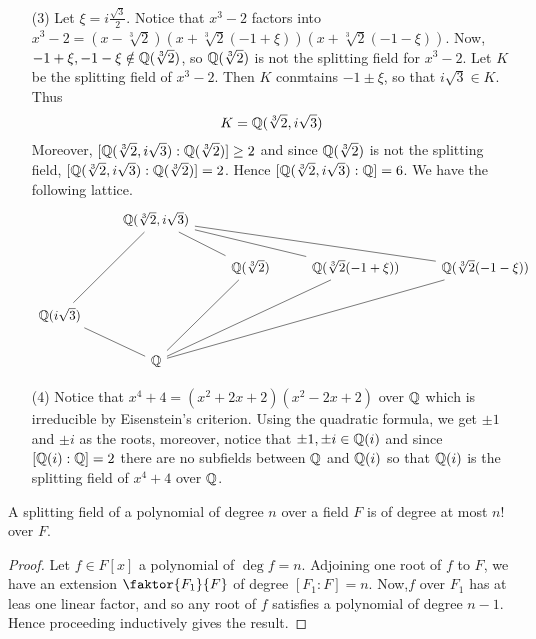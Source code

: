 \begin{example}
\begin{enumerate}
         \item[(3)] Let $\xi=i\frac{\sqrt{3}}{2}$. Notice that $x^3-2$ factors
             into
             $x^3-2=(x-\sqrt[3]{2})(x+\sqrt[3]{2}(-1+\xi))(x+\sqrt[3]{2}(-1-\xi))$.
             Now, $-1+\xi,-1-\xi \notin \mathbb{Q}(\sqrt[3]{2})$, so $\mathbb{Q}(\sqrt[3]{2})$
             is not the splitting field for $x^3-2$. Let  $K$ be the splitting
             field of  $x^3-2$. Then  $K$ conmtains $-1 \pm \xi$, so that
             $i\sqrt{3} \in K$. Thus
             \begin{equation*}
                 K=\mathbb{Q}(\sqrt[3]{2},i\sqrt{3})
             \end{equation*}
             Moreover, $[\mathbb{Q}(\sqrt[3]{2},i\sqrt{3}):\mathbb{Q}(\sqrt[3]{2})] \geq 2$
             and since $\mathbb{Q}(\sqrt[3]{2})$ is not the splitting field,
             $[\mathbb{Q}(\sqrt[3]{2},i\sqrt{3}):\mathbb{Q}(\sqrt[3]{2})]=2$. Hence
             $[\mathbb{Q}(\sqrt[3]{2},i\sqrt{3}):\mathbb{Q}]=6$. We have the following lattice.
             \[\begin{tikzcd}
                & {\Q(\sqrt[3]{2},i\sqrt{3})} \\
                && {\Q(\sqrt[3]{2})} & {\Q(\sqrt[3]{2}(-1+\xi))} & {\Q(\sqrt[3]{2}
                    (-1-\xi))} \\
                {\mathbb{Q}(i\sqrt{3})} \\
                & {\mathbb{Q}}
                \arrow[no head, from=1-2, to=3-1]
                \arrow[no head, from=3-1, to=4-2]
                \arrow[no head, from=4-2, to=2-4]
                \arrow[no head, from=2-4, to=1-2]
                \arrow[no head, from=1-2, to=2-3]
                \arrow[no head, from=2-3, to=4-2]
                \arrow[no head, from=1-2, to=2-5]
                \arrow[no head, from=2-5, to=4-2]
            \end{tikzcd}\]

        \item[(4)] Notice that $x^4+4=(x^2+2x+2)(x^2-2x+2)$ over $\mathbb{Q}$ which is
            irreducible by Eisenstein's criterion. Using the quadratic formula,
            we get $\pm{1}$ and $\pm{i}$ as the roots, moreover, notice that
            $\pm{1},\pm{i} \in \mathbb{Q}(i)$ and since $[\mathbb{Q}(i):\mathbb{Q}]=2$ there are no
            subfields between $\mathbb{Q}$ and  $\mathbb{Q}(i)$ so that $\mathbb{Q}(i)$ is the splitting
            field of $x^4+4$ over  $\mathbb{Q}$.
    \end{enumerate}
\end{example}

\begin{lemma}\label{1.4.2}
    A splitting field of a polynomial of degree $n$ over a field  $F$ is of
    degree at most  $n!$ over  $F$.
\end{lemma}
\begin{proof}
    Let $f \in F[x]$ a polynomial of $\deg{f}=n$. Adjoining one root of $f$ to
    $F$, we have an extension $\faktor{F_1}{F}$ of degree $[F_1:F]=n$. Now,$f$
    over $F_1$ has at leas one linear factor, and so any root of $f$ satisfies a
    polynomial of degree $n-1$. Hence proceeding inductively gives the result.
\end{proof}

